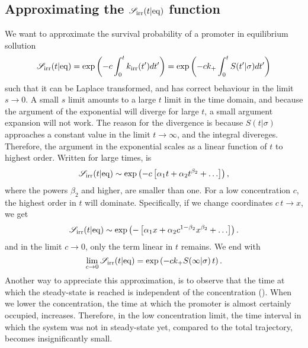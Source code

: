 \subsection{ Approximating the $\mathscr{S}_{\rm irr}(t|{\rm eq})$ function}
We want to approximate the survival probability of a promoter in equilibrium sollution
\begin{equation}
 \mathscr{S}_{\rm irr}(t|{\rm eq}) = {\rm exp}\left(-c \int_0^t k_{{\rm irr}}(t') dt'\right) = {\rm exp}\left(-c k_+ \int_0^t S(t'|\sigma) dt'\right)
 \elabel{Seq_app}
\end{equation}
such that it can be Laplace transformed, and has correct behaviour in the limit $s\to0$. A small $s$ limit amounts to a large $t$ limit in the time domain, and because the argument of the exponential will diverge for large $t$, a small argument expansion will not work. The reason for the divergence is because $S(t|\sigma)$ approaches a constant value in the limit $t\to\infty$, and the integral divereges. Therefore, the argument in the exponential scales as a linear function of $t$ to highest order. Written for large times,  is
\begin{equation}
 \mathscr{S}_{\rm irr}(t|{\rm eq}) \sim {\rm exp}\left(-c \left[ \alpha_1 t + \alpha_2 t^{\beta_2} + \ldots \right] \right),
\end{equation}
where the powers $\beta_2$ and higher, are smaller than one. For a low concentration $c$, the highest order in $t$ will dominate. Specifically, if we change coordinates $c\,t\to x$, we get
\begin{equation}
 \mathscr{S}_{\rm irr}(t|{\rm eq}) \sim {\rm exp}\left(-\left[ \alpha_1 x + \alpha_2 c^{1-\beta_2} x^{\beta_2} + \ldots \right] \right).
\end{equation}
and in the limit $c\to0$, only the term linear in $t$ remains. We end with
\begin{equation}
 \lim_{c\to0} \mathscr{S}_{\rm irr}(t|{\rm eq}) = {\rm exp}\left(-c k_+ S(\infty|\sigma) \, t \right).
 \elabel{Seq_app2}
\end{equation}
Another way to appreciate this approximation, is to observe that the time at which the steady-state is reached is independent of the concentration (). When we lower the concentration, the time at which the promoter is almost certainly occupied, increases. Therefore, in the low concentration limit, the time interval in which the system was not in steady-state yet, compared to the total trajectory, becomes insignificantly small.

